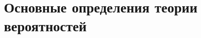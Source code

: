 \documentclass[discrete.tex]{subfiles}
\begin{document}
\section{Основные определения теории вероятностей}
\end{document}

